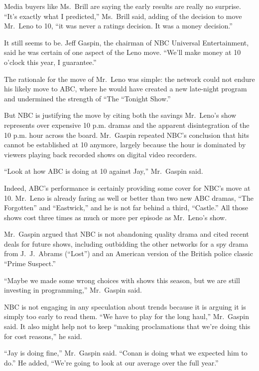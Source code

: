 ﻿\documentclass[12pt]{article}
\begin{document}
Media buyers like Ms.~Brill are saying the early results are really no surprise. ``It's exactly what
I predicted,'' Ms.~Brill said, adding of the decision to move Mr.~Leno to 10, ``it was never a
ratings decision. It was a money decision.''

It still seems to be. Jeff Gaspin, the chairman of NBC Universal Entertainment, said he was certain
of one aspect of the Leno move. ``We'll make money at 10 o'clock this year, I guarantee.''

The rationale for the move of Mr.~Leno was simple: the network could not endure his likely move to
ABC, where he would have created a new late-night program and undermined the strength of ``The
``Tonight Show.''

But NBC is justifying the move by citing both the savings Mr.~Leno's show represents over expensive
10 p.m. dramas and the apparent disintegration of the 10 p.m. hour across the board. Mr.~Gaspin
repeated NBC's conclusion that hits cannot be established at 10 anymore, largely because the hour is
dominated by viewers playing back recorded shows on digital video recorders.

``Look at how ABC is doing at 10 against Jay,'' Mr.~Gaspin said.

Indeed, ABC's performance is certainly providing some cover for NBC's move at 10. Mr.~Leno is
already faring as well or better than two new ABC dramas, ``The Forgotten'' and ``Eastwick,'' and he
is not far behind a third, ``Castle.'' All those shows cost three times as much or more per episode
as Mr.~Leno's show.

Mr.~Gaspin argued that NBC is not abandoning quality drama and cited recent deals for future shows,
including outbidding the other networks for a spy drama from J.~J.~Abrams (``Lost'') and an American
version of the British police classic ``Prime Suspect.''

``Maybe we made some wrong choices with shows this season, but we are still investing in
programming,'' Mr.~Gaspin said.

NBC is not engaging in any speculation about trends because it is arguing it is simply too early to
read them. ``We have to play for the long haul,'' Mr.~Gaspin said. It also might help not to keep
``making proclamations that we're doing this for cost reasons,'' he said.

``Jay is doing fine,'' Mr.~Gaspin said. ``Conan is doing what we expected him to do.'' He added,
``We're going to look at our average over the full year.''
\end{document}
